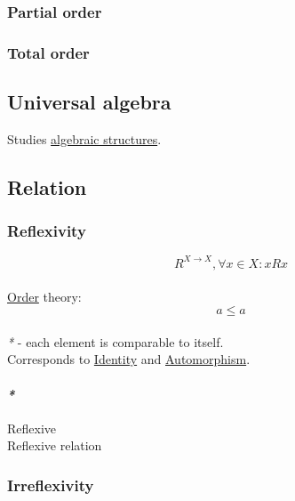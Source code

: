 \documentclass[11pt]{article}
\begin{document}
\subsubsection{\label{org42093ef}Partial order}
\label{sec:orgc0157c4}

\subsubsection{\label{org894e110}Total order}
\label{sec:orgf58be89}

\subsection{\label{org6d6bfe0}Universal algebra}
\label{sec:org03ebaee}

Studies \hyperref[org0b3e581]{algebraic structures}.\\

\subsection{\label{orgca09f0a}Relation}
\label{sec:org5405af5}

\subsubsection{\label{orge9d4ceb}Reflexivity}
\label{sec:org7493818}

$$ R^{X \to X}, \forall x \in X : x R x $$\\
\hyperref[orgc0a359b]{Order} theory: $$ a \le a $$\\

\emph{*} - each element is comparable to itself.\\

Corresponds to \hyperref[org9b95fd5]{Identity} and \hyperref[org4f0787d]{Automorphism}.\\

\paragraph{\emph{*}}
\label{sec:orgbea7a8b}

\label{orgc0de209}Reflexive\\
\label{org04f95a2}Reflexive relation\\

\subsubsection{\label{org6d99841}Irreflexivity}
\label{sec:org2b62cb7}
\end{document}
